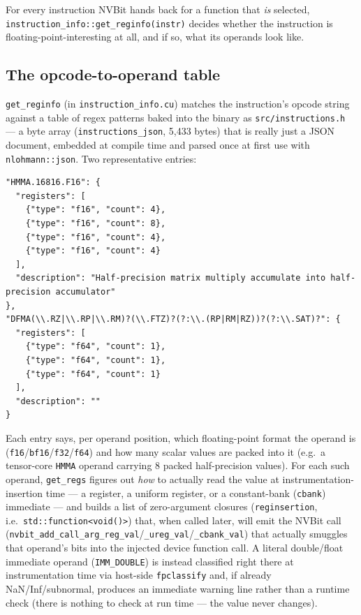 \documentclass[11pt]{article}
\begin{document}
For every instruction NVBit hands back for a function that \emph{is}
selected, \texttt{instruction\_info::get\_reginfo(instr)} decides whether
the instruction is floating-point-interesting at all, and if so, what its
operands look like.

\subsection{The opcode-to-operand table}

\texttt{get\_reginfo} (in \texttt{instruction\_info.cu}) matches the
instruction's opcode string against a table of regex patterns baked into
the binary as \texttt{src/instructions.h} --- a byte array
(\texttt{instructions\_json}, 5{,}433 bytes) that is really just a JSON
document, embedded at compile time and parsed once at first use with
\texttt{nlohmann::json}. Two representative entries:

\begin{lstlisting}
"HMMA.16816.F16": {
  "registers": [
    {"type": "f16", "count": 4},
    {"type": "f16", "count": 8},
    {"type": "f16", "count": 4},
    {"type": "f16", "count": 4}
  ],
  "description": "Half-precision matrix multiply accumulate into half-precision accumulator"
},
"DFMA(\\.RZ|\\.RP|\\.RM)?(\\.FTZ)?(?:\\.(RP|RM|RZ))?(?:\\.SAT)?": {
  "registers": [
    {"type": "f64", "count": 1},
    {"type": "f64", "count": 1},
    {"type": "f64", "count": 1}
  ],
  "description": ""
}
\end{lstlisting}

Each entry says, per operand position, which floating-point format the
operand is (\texttt{f16}/\texttt{bf16}/\texttt{f32}/\texttt{f64}) and how
many scalar values are packed into it (e.g.\ a tensor-core \texttt{HMMA}
operand carrying 8 packed half-precision values). For each such operand,
\texttt{get\_regs} figures out \emph{how} to actually read the value at
instrumentation-insertion time --- a register, a uniform register, or a
constant-bank (\texttt{cbank}) immediate --- and builds a list of
zero-argument closures (\texttt{reginsertion}, i.e.\
\texttt{std::function<void()>}) that, when called later, will emit the
NVBit call
(\texttt{nvbit\_add\_call\_arg\_reg\_val}/\texttt{\_ureg\_val}/\texttt{\_cbank\_val})
that actually smuggles that operand's bits into the injected device
function call. A literal double/float immediate operand
(\texttt{IMM\_DOUBLE}) is instead classified right there at instrumentation
time via host-side \texttt{fpclassify} and, if already NaN/Inf/subnormal,
produces an immediate warning line rather than a runtime check (there is
nothing to check at run time --- the value never changes).
\end{document}
